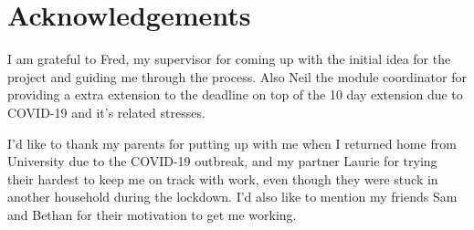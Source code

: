 \thispagestyle{empty}


\section*{\centering Acknowledgements}


I am grateful to Fred, my supervisor for coming up with the initial idea for the project and guiding me through the process. Also Neil the module coordinator for providing a extra extension to the deadline on top of the 10 day extension due to COVID-19 and it's related stresses.

I'd like to thank my parents for putting up with me when I returned home from University due to the COVID-19 outbreak, and my partner Laurie for trying their hardest to keep me on track with work, even though they were stuck in another household during the lockdown. I'd also like to mention my friends Sam and Bethan for their motivation to get me working.

